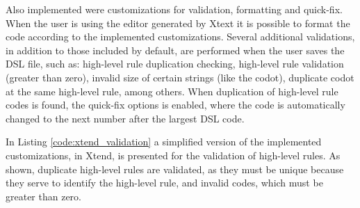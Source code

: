 \documentclass[AMA,STIX1COL]{WileyNJD-v2}
\begin{document}

Also implemented were customizations for validation, formatting and quick-fix. When the user is using the editor generated by Xtext it is possible to format the code according to the implemented customizations. Several additional validations, in addition to those included by default, are performed when the user saves the DSL file, such as: high-level rule duplication checking, high-level rule validation (greater than zero), invalid size of certain strings (like the codot), duplicate codot at the same high-level rule, among others. When duplication of high-level rule codes is found, the quick-fix options is enabled, where the code is automatically changed to the next number after the largest DSL code.



In Listing \ref{code:xtend_validation} a simplified version of the implemented customizations, in Xtend, is presented for the validation of high-level rules. %
As shown, duplicate high-level rules are validated, as they must be unique because they serve to identify the high-level rule, and invalid codes, which must be greater than zero.
\end{document}
